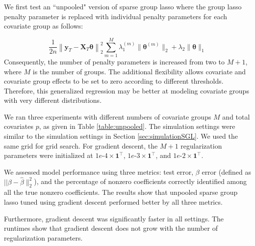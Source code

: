 \documentclass[10pt,letterpaper]{article}
\begin{document}
We first test an ``unpooled" version of sparse group lasso where the group lasso penalty parameter is replaced with individual penalty parameters for each covariate group as follows:

\begin{equation}
\frac{1}{2n} 
\left \| \boldsymbol{y}_T - \boldsymbol{X}_T \boldsymbol{\theta} \right \|^2_2
\sum_{m=1}^M \lambda_1^{(m)} \| \boldsymbol \theta^{(m)} \|_2
+ \lambda_2 \| \boldsymbol \theta \|_1
\label{unpooledSGL}
\end{equation}
Consequently, the number of penalty parameters is increased from two to $M+1$, where $M$ is the number of groups. The additional flexibility allows covariate and covariate group effects to be set to zero according to different thresholds. Therefore, this generalized regression may be better at modeling covariate groups with very different distributions.

We ran three experiments with different numbers of covariate groups $M$ and total covariates $p$, as given in Table \ref{table:unpooled}. The simulation settings were similar to the simulation settings in Section \ref{sec:simulationSGL}. We used the same grid for grid search. For gradient descent, the $M+1$ regularization parameters were initialized at $1e\text{-}4 \times \boldsymbol 1^\top$, $1e\text{-}3 \times \boldsymbol 1^\top$, and $1e\text{-}2 \times \boldsymbol 1^\top$.

We assessed model performance using three metrics: test error, $\beta$ error (defined as $\lvert \lvert \beta - \hat \beta \|_2 ^2$), and the percentage of nonzero coefficients correctly identified among all the true nonzero coefficients. The results show that unpooled sparse group lasso tuned using gradient descent performed better by all three metrics.

Furthermore, gradient descent was significantly faster in all settings. The runtimes show that gradient descent does not grow with the number of regularization parameters.
\end{document}

